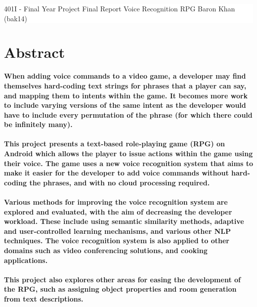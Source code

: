 \documentclass[11pt]{article}
\date{16 March 2017}
\begin{document}
\vspace*{6cm}
\colorbox{white}{
	\parbox[t]{1.0\linewidth}{
		\centering \fontsize{50pt}{80pt}\selectfont %
		\vspace*{0.7cm} %

		{401I - Final Year Project} \break
		\vspace*{0.7cm}
		Final Report
		\break
		Voice Recognition RPG
		\break
		Baron Khan (bak14)
		\vspace*{0.7cm} %
	}
}
\vfill %




\newpage
\thispagestyle{empty}
\tableofcontents
\newpage
\setcounter{page}{1}
\section{Abstract}

\textbf{When adding voice commands to a video game, a developer may find themselves hard-coding text strings for phrases that a player can say, and mapping them to intents within the game. It becomes more work to include varying versions of the same intent as the developer would have to include every permutation of the phrase (for which there could be infinitely many).
\\
\\
This project presents a text-based role-playing game (RPG) on Android which allows the player to issue actions within the game using their voice. The game uses a new voice recognition system that aims to make it easier for the developer to add voice commands without hard-coding the phrases, and with no cloud processing required.
\\
\\
Various methods for improving the voice recognition system are explored and evaluated, with the aim of decreasing the developer workload. These include using semantic similarity methods, adaptive and user-controlled learning mechanisms, and various other NLP techniques. The voice recognition system is also applied to other domains such as video conferencing solutions, and cooking applications.
\\
\\
This project also explores other areas for easing the development of the RPG, such as assigning object properties and room generation from text descriptions.}
\end{document}
